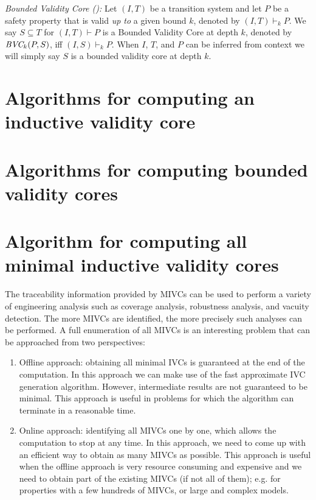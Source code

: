 \begin{definition}{\emph{Bounded Validity Core (\bvc):}}
  \label{def:ivc}
  Let $(I, T)$ be a transition system and let $P$ be a
  safety property that is valid\emph{ up to }a given bound $k$, denoted by $(I, T)\vdash _{k} P$.
  We say $S \subseteq T$ for $(I, T)\vdash P$ is a Bounded Validity Core at depth $k$,
  denoted by $\textit{BVC} _{k}(P, S)$, iff $(I, S) \vdash _{k} P $.
  When $I$, $T$, and $P$ can be inferred from
  context we will simply say $S$ is a bounded validity core at depth $k$.
\end{definition}


\section{Algorithms for computing an inductive validity core}



\section{Algorithms for computing bounded validity cores}
\label{sec:bvc}


\section{Algorithm for computing all minimal inductive validity cores}
The traceability information provided by MIVCs can be used to perform a variety of engineering analysis such as coverage analysis, robustness analysis, and vacuity detection.  The more MIVCs are identified, the more precisely such analyses can be performed. A full enumeration of all MIVCs is an interesting problem that can be approached from two perspectives:
\begin{enumerate}
  \item Offline approach: obtaining all minimal IVCs is guaranteed at the end of the computation. In this approach we can make use of the fast approximate IVC generation algorithm. However, intermediate results are not guaranteed to be minimal. This approach is useful in problems for which the algorithm can terminate in a reasonable time.
  \item Online approach: identifying all MIVCs one by one, which allows the computation to stop at any time. In this approach, we need to come up with an efficient way to obtain as many MIVCs as possible. This approach is useful when the offline approach is very resource consuming and expensive and we need to obtain part of the existing MIVCs (if not all of them); e.g. for properties with a few hundreds of MIVCs, or large and complex models.
\end{enumerate}

